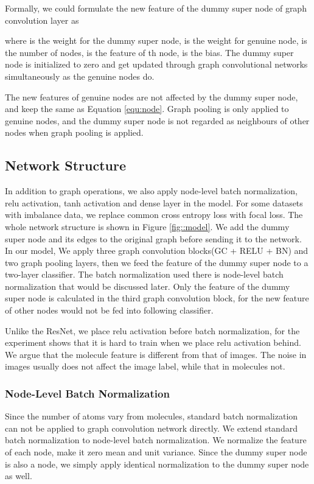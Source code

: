 \documentclass[letterpaper]{article} \usepackage{aaai18}  \usepackage{times}  \usepackage{helvet}  \usepackage{courier}  \usepackage{url}  \usepackage{graphicx}  \usepackage{amsmath}
\begin{document}
Formally, we could formulate the new feature of the dummy super node  of graph convolution layer as 

where  is the weight for the dummy super node,  is the weight for genuine node,  is the number of nodes,  is the feature of th node,  is the bias. The dummy super node  is initialized to zero and get updated through graph convolutional networks simultaneously as the genuine nodes do.

The new features of genuine nodes are not affected by the dummy super node, and keep the same as Equation \ref{equ:node}. Graph pooling is only applied to genuine nodes, and the dummy super node is not regarded as neighbours of other nodes when graph pooling is applied.






\subsection{Network Structure}


In addition to graph operations, we also apply node-level batch normalization, relu activation, tanh activation and dense layer in the model. For some datasets with imbalance data, we replace common cross entropy loss with focal loss. The whole network structure is shown in Figure \ref{fig::model}. We add the dummy super node and its edges to the original graph before sending it to the network. In our model, We apply three graph convolution blocks(GC + RELU + BN) and two graph pooling layers, then we feed the feature of the dummy super node to a two-layer classifier. The batch normalization used there is node-level batch normalization that would be discussed later. Only  the feature of the dummy super node is calculated in the third graph convolution block, for the new feature of other nodes would not be fed into following classifier.

Unlike the ResNet, we place relu activation before batch normalization, for the experiment shows that it is hard to train when we place relu activation behind. We argue that the molecule feature is different from that of images. The noise in images usually does not affect the image label, while that in molecules not. 

\subsubsection{Node-Level Batch Normalization}
Since the number of atoms vary from molecules, standard batch normalization\cite{ioffe2015batch} can not be applied to graph convolution network directly. We extend standard batch normalization to node-level batch normalization. We normalize the feature of each node, make it zero mean and unit variance. Since the dummy super node is also a node, we simply apply identical normalization to the dummy super node as well.
\end{document}
